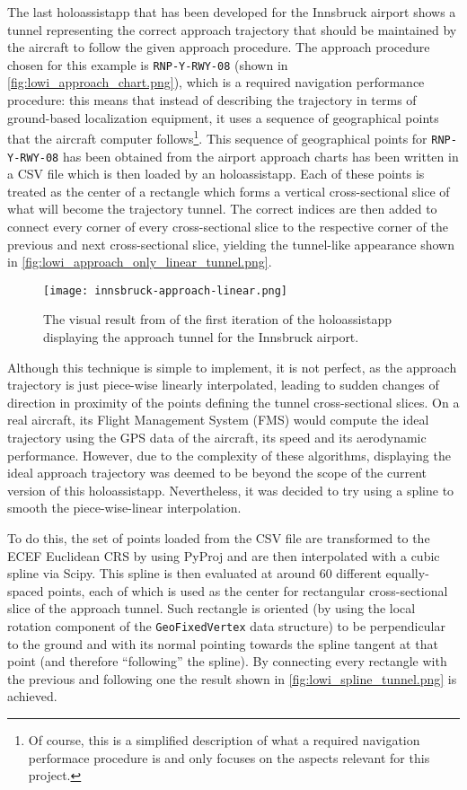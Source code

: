 The last \gls{holoassistapp} that has been developed for the Innsbruck airport shows a tunnel representing the correct approach trajectory that should be maintained by the aircraft to follow the given approach procedure. The approach procedure chosen for this example is \texttt{RNP-Y-RWY-08} (shown in \autoref{fig:lowi_approach_chart.png}), which is a required navigation performance procedure: this means that instead of describing the trajectory in terms of ground-based localization equipment, it uses a sequence of geographical points that the aircraft computer  follows\footnote{Of course, this is a simplified description of what a required navigation performace procedure is and only focuses on the aspects relevant for this project.}. This sequence of geographical points for \texttt{RNP-Y-RWY-08} has been obtained from the airport approach charts has been written in a CSV file which is then loaded by an \gls{holoassistapp}. Each of these points is treated as the center of a rectangle which forms a vertical cross-sectional slice of what will become the trajectory tunnel. The correct indices are then added to connect every corner of every cross-sectional slice to the respective corner of the previous and next cross-sectional slice, yielding the tunnel-like appearance shown in \autoref{fig:lowi_approach_only_linear_tunnel.png}.

\begin{figure}
  \centering
  \texttt{[image: innsbruck-approach-linear.png]}
  \caption{The visual result from of the first iteration of the \gls{holoassistapp} displaying the approach tunnel for the Innsbruck airport.}\label{fig:lowi_approach_only_linear_tunnel.png}
\end{figure}

Although this technique is simple to implement, it is not perfect, as the approach trajectory is just piece-wise linearly interpolated, leading to sudden changes of direction in proximity of the points defining the tunnel cross-sectional slices. On a real aircraft, its Flight Management System (FMS) would compute the ideal trajectory using the GPS data of the aircraft, its speed and its aerodynamic performance. However, due to the complexity of these algorithms, displaying the ideal approach trajectory was deemed to be beyond the scope of the current version of this \gls{holoassistapp}. Nevertheless, it was decided to try using a spline to smooth the piece-wise-linear interpolation.

To do this, the set of points loaded from the CSV file are transformed to the \gls{ECEF} Euclidean \gls{CRS} by using PyProj and are then interpolated with a cubic spline via Scipy. This spline is then evaluated at around $60$ different equally-spaced points, each of which is used as the center for rectangular cross-sectional slice of the approach tunnel. Such rectangle is oriented (by using the local rotation component of the \texttt{GeoFixedVertex} data structure) to be perpendicular to the ground and with its normal pointing towards the spline tangent at that point (and therefore \enquote{following} the spline). By connecting every rectangle with the previous and following one the result shown in \autoref{fig:lowi_spline_tunnel.png} is achieved.

